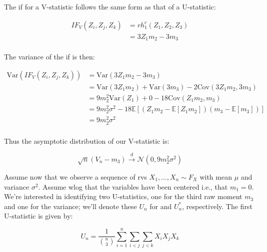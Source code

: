 \documentclass{report}
\begin{document}
The \gls{if} for a V-statistic follows the same form as that of a U-statistic:

\begin{equation}\label{eq:ex-lst-v-statistic-m3-if}
    \begin{aligned}
        IF_V(Z_i, Z_j, Z_k)
          &= rh_1^c(Z_1, Z_2, Z_3) \\
          &= 3Z_1m_2 - 3m_3 \\
    \end{aligned}
\end{equation}

The variance of the \gls{if} is then:

\begin{equation}\label{eq:ex-lst-v-statistic-m3-if-variance}
    \begin{aligned}
        \text{Var}\left(IF_V(Z_i, Z_j, Z_k)\right)
          &= \text{Var}(3Z_1m_2 - 3m_3) \\
          &= \text{Var}(3Z_1m_2) + \text{Var}(3m_3) - 2\text{Cov}(3Z_1m_2, 3m_3) \\
          &= 9m_2^2\text{Var}(Z_1) + 0 - 18\text{Cov}(Z_1m_2, m_3) \\
          &= 9m_2^2\sigma^2 - 18\mathbb{E}[(Z_1m_2 - \mathbb{E}[Z_1m_2])(m_3 - \mathbb{E}[m_3])] \\
          &= 9m_2^2\sigma^2 \\
    \end{aligned}
\end{equation}

Thus the asymptotic distribution of our V-statistic is:

\begin{equation}\label{eq:ex-lst-v-statistic-m3-asymptotics}
    \sqrt{n}(V_n - m_3) \overset{d}{\to} \mathcal{N}(0, 9m_2^2\sigma^2)
\end{equation}

Assume now that we observe a sequence of \glspl{rv} $X_1, \dots, X_n \sim F_X$ with mean $\mu$ and variance $\sigma^2$. Assume \gls{wlog} that the variables have been centered i.e., that $m_1 = 0$. We're interested in identifying two U-statistics, one for the third raw moment $m_3$ and one for the variance; we'll denote these $U_n$ for and $U_n^*$, respectively. The first U-statistic is given by:

\begin{equation}\label{eq:ex-lst-u-statistic-joint-m3}
    U_n = \frac{1}{\binom{n}{3}} \sum_{i=1}^n \sum_{i<j} \sum_{j<k} X_iX_jX_k
\end{equation}
\end{document}
